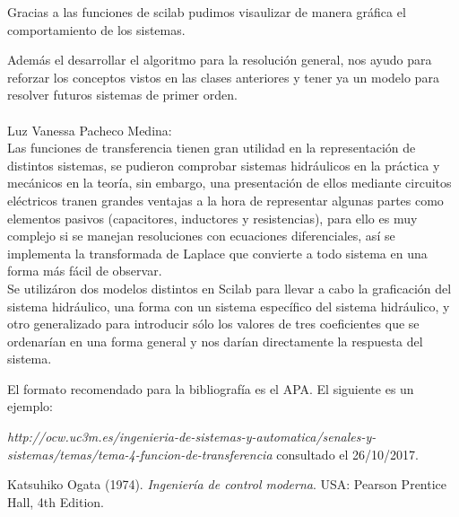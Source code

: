 \documentclass[12pt,letterpaper]{article}     %
\begin{document}
Gracias a las funciones de scilab pudimos visaulizar de manera gráfica el comportamiento de los sistemas. 

Además el desarrollar el algoritmo para la resolución general, nos ayudo para reforzar los conceptos vistos en las clases anteriores y tener ya un modelo para resolver futuros sistemas de primer orden.\\\\
Luz Vanessa Pacheco Medina:\\
Las funciones de transferencia tienen gran utilidad en la representación de distintos sistemas, se pudieron comprobar sistemas hidráulicos en la práctica y mecánicos en la teoría, sin embargo, una presentación de ellos mediante circuitos eléctricos tranen grandes ventajas a la hora de representar algunas partes como elementos pasivos (capacitores, inductores y resistencias), para ello es muy complejo si se manejan resoluciones con ecuaciones diferenciales, así se implementa la transformada de Laplace que convierte a todo sistema en una forma más fácil de observar. \\
Se utilizáron dos modelos distintos en Scilab para llevar a cabo la graficación del sistema hidráulico, una forma con un sistema específico del sistema hidráulico, y otro generalizado para introducir sólo los valores de tres coeficientes que se ordenarían en una forma general y nos darían directamente la respuesta del sistema.




\newpage

El formato recomendado para la bibliografía es el APA. El siguiente es un ejemplo:

\begin{thebibliography}{}
 \emph{http://ocw.uc3m.es/ingenieria-de-sistemas-y-automatica/senales-y-sistemas/temas/tema-4-funcion-de-transferencia} consultado el 26/10/2017.

 Katsuhiko Ogata (1974). \emph{Ingeniería de control moderna}. USA:  Pearson Prentice Hall, 4th Edition.



\end{thebibliography}

\newpage


\end{document}
